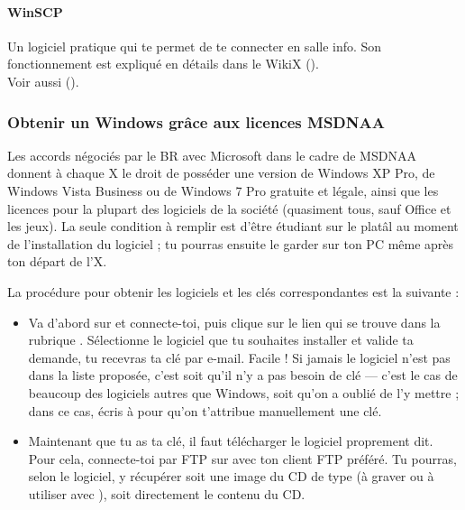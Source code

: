   \paragraph{WinSCP} Un logiciel pratique qui te permet de te connecter en salle info.
                  Son fonctionnement est expliqu\'e en d\'etails dans le WikiX ().  \\
                  Voir aussi  ().


\subsubsection{Obtenir un Windows gr\^ace aux licences MSDNAA}

\label{msdnaa} Les accords n\'egoci\'es par le BR avec Microsoft dans le cadre de MSDNAA donnent \`a  chaque X le droit de poss\'eder une version de Windows
XP Pro, de Windows Vista Business ou de Windows 7 Pro gratuite et l\'egale, ainsi que les licences pour la plupart des logiciels de la soci\'et\'e (quasiment tous, sauf
Office et les jeux). La seule condition \`a  remplir est d'\^etre \'etudiant sur le plat\^al au moment de l'installation du logiciel ; tu pourras ensuite le
garder sur ton PC m\^eme apr\`es ton d\'epart de l'X.

La proc\'edure pour obtenir les logiciels et les cl\'es correspondantes
est la suivante :
\begin{itemize}

\item Va d'abord sur \fkz et connecte-toi, puis clique sur le lien  qui se trouve dans la rubrique . S\'electionne le logiciel que tu souhaites installer et valide ta demande, tu recevras ta cl\'e par e-mail. Facile ! Si jamais le logiciel n'est pas dans la liste propos\'ee, c'est soit qu'il n'y a pas besoin de cl\'e --- c'est le cas de beaucoup des logiciels autres que Windows, soit qu'on a oubli\'e de l'y mettre ; dans ce cas, \'ecris \`a   pour qu'on t'attribue manuellement une cl\'e.

\item Maintenant que tu as ta cl\'e, il faut t\'el\'echarger le logiciel proprement
dit. Pour cela, connecte-toi par FTP sur  avec ton client FTP pr\'ef\'er\'e. Tu pourras, selon le logiciel, y r\'ecup\'erer soit une image du CD de type  (\`a 
graver ou \`a  utiliser avec ), soit directement le contenu du CD.
 
\end{itemize}

